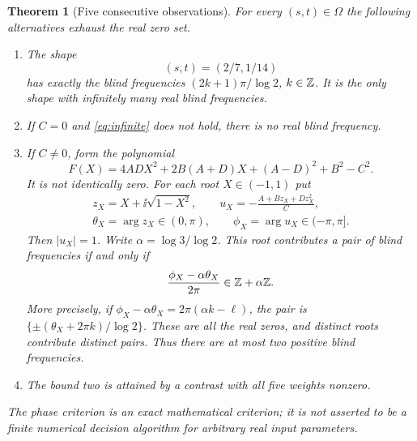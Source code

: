 \documentclass[11pt]{article}
\newtheorem{theorem}{Theorem}[section]
\theoremstyle{definition}\newtheorem{definition}[theorem]{Definition}
\theoremstyle{remark}\newtheorem{remark}[theorem]{Remark}
\newcommand{\Shape}{\Omega}
\begin{document}
\begin{theorem}[Five consecutive observations]\label{thm:classification}
For every $(s,t)\in\Shape$ the following alternatives exhaust the real zero set.
\begin{enumerate}[label=\textup{(\roman*)}]
\item The shape
\begin{equation}\label{eq:infinite}
 (s,t)=(2/7,1/14)
\end{equation}
has exactly the blind frequencies $(2k+1)\pi/\log2$, $k\in\mathbb Z$.
It is the only shape with infinitely many real blind frequencies.
\item If $C=0$ and \eqref{eq:infinite} does not hold, there is no real blind frequency.
\item If $C\ne0$, form the polynomial
\begin{equation}\label{eq:F}
 F(X)=4AD X^2+2B(A+D)X+(A-D)^2+B^2-C^2.
\end{equation}
It is not identically zero. For each root $X\in(-1,1)$ put
\begin{gather*}
 z_X=X+\ii\sqrt{1-X^2},\qquad
 u_X=-\frac{A+Bz_X+Dz_X^2}{C},\\
 \theta_X=\arg z_X\in(0,\pi),\qquad \phi_X=\arg u_X\in(-\pi,\pi].
\end{gather*}
Then $|u_X|=1$. Write $\alpha=\log3/\log2$.
This root contributes a pair of blind frequencies if and only if
\begin{equation}\label{eq:phase}
 \frac{\phi_X-\alpha\theta_X}{2\pi}\in\mathbb Z+\alpha\mathbb Z.
\end{equation}
More precisely, if $\phi_X-\alpha\theta_X=2\pi(\alpha k-\ell)$,
the pair is
$\{\pm(\theta_X+2\pi k)/\log2\}$.
These are all the real zeros, and distinct roots contribute distinct pairs.
Thus there are at most two positive blind frequencies.
\item The bound two is attained by a contrast with all five weights nonzero.
\end{enumerate}
The phase criterion is an exact mathematical criterion; it is not asserted to be a
finite numerical decision algorithm for arbitrary real input parameters.
\end{theorem}
\end{document}
